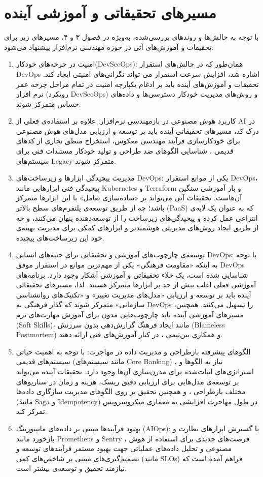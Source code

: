 \section{مسیرهای تحقیقاتی و آموزشی آینده}
\label{sec:ch6-future-work}

با توجه به چالش‌ها و روندهای بررسی‌شده، به‌ویژه در فصول ۳ و ۴، مسیرهای زیر برای تحقیقات و آموزش‌های آتی در حوزه مهندسی نرم‌افزار پیشنهاد می‌شود:

\begin{enumerate}
  \item امنیت در چرخه‌های خودکار(DevSecOps): همان‌طور که در چالش‌های استقرار DevOps اشاره شد، افزایش سرعت استقرار می تواند نگرانی‌های امنیتی ایجاد کند. تحقیقات و آموزش‌های آینده باید بر ادغام یکپارچه امنیت در تمام مراحل چرخه عمر نرم افزار (رویکرد DevSecOps) و روش‌های مدیریت خودکار دسترسی‌ها و داده‌های حساس متمرکز شوند.
  \item کاربرد هوش مصنوعی در بازمهندسی نرم‌افزار: علاوه بر استفاده‌ی فعلی از AI در درک کد، مسیرهای تحقیقاتی آینده باید بر توسعه و ارزیابی مدل‌های هوش مصنوعی برای خودکارسازی فرآیند مهندسی معکوس، استخراج منطق تجاری از کدهای قدیمی ، شناسایی الگوهای ضد طراحی و تولید خودکار مستندات فنی برای سیستم‌های Legacy متمرکز شوند.
  \item مدیریت پیچیدگی ابزارها و زیرساخت‌های DevOps: یکی از موانع استقرار DevOps، پیچیدگی فنی ابزارهایی مانند Kubernetes و Terraform و بار آموزشی سنگین آن‌هاست. تحقیقات آتی می‌تواند بر «ساده‌سازی تعامل» با این ابزارها متمرکز باشد؛ چه از طریق توسعه‌ی پلتفرم‌های سطح بالاتر (PaaS) که به عنوان یک لایه‌ی انتزاعی عمل کرده و پیچیدگی‌های زیرساخت را از توسعه‌دهنده پنهان می‌کنند، و چه از طریق ایجاد روش‌های مدیریتی هوشمندتر و ابزارهای کمکی برای مدیریت بهینه‌ی خود این زیرساخت‌های پیچیده.
  \item توسعه‌ی چارچوب‌های آموزشی و تحقیقاتی برای جنبه‌های انسانی DevOps: با توجه به اینکه «مقاومت فرهنگی» یکی از مهم‌ترین موانع در استقرار موفق DevOps شناسایی شده است، یک خلاء تحقیقاتی و آموزشی آشکار وجود دارد. برنامه‌های آموزشی فعلی اغلب بیش از حد بر ابزارها متمرکز هستند. لذا، مسیرهای تحقیقاتی آینده باید بر توسعه و ارزیابی «مدل‌های مدیریت تغییر» و «تکنیک‌های روانشناسی سازمانی» متمرکز شوند که گذار فرهنگی به DevOps را تسهیل می‌کنند. همچنین، مسیرهای آموزشی آینده باید چارچوب‌هایی مدون برای آموزش مهارت‌های نرم (Soft Skills)، مانند ایجاد فرهنگ گزارش‌دهی بدون سرزنش (Blameless Postmortem) و همکاری بین‌تیمی ، در کنار آموزش‌های فنی ارائه دهند.
  \item الگوهای پیشرفته بازطراحی و مدیریت داده در مهاجرت: با توجه به اهمیت حیاتی سیستم‌های قدیمی (مانند سیستم‌های Core Banking) ، نیاز به الگوها و استراتژی‌های اثبات‌شده برای مدرن‌سازی آن‌ها وجود دارد. تحقیقات آینده می‌تواند بر توسعه‌ی مدل‌هایی برای ارزیابی دقیق ریسک، هزینه و زمان در سناریوهای مختلف بازطراحی ، و همچنین تحقیق بر روی الگوهای مدیریت سازگاری داده‌ها (مانند Saga و Idempotency) در طول مهاجرت افزایشی به معماری میکروسرویس تمرکز کند.
  \item بهبود فرآیندها مبتنی بر داده‌های مانیتورینگ (AIOps): با گسترش ابزارهای نظارت و بازخورد مانند Prometheus و Sentry ، فرصت‌های جدیدی برای استفاده از هوش مصنوعی و تحلیل داده‌های عملیاتی جهت بهبود مستمر فرآیندهای توسعه و تصمیم‌گیری‌های مبتنی بر شاخص‌های کمی (مانند SLOs) فراهم آمده است که نیازمند تحقیق و توسعه‌ی بیشتر است.
\end{enumerate}
